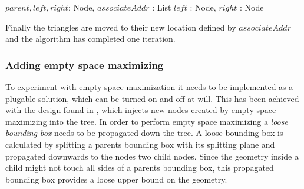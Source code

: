 \begin{algorithm}
  \caption{Compute child node triangle index and range}
  \label{alg:childIndices}
  \begin{algorithmic}
              {$parent, left, right$: Node, $associateAddr$ : List}
              {$left$ : Node, $right$ : Node}{
              }
  \end{algorithmic}
\end{algorithm}

Finally the triangles are moved to their new location defined by
$associateAddr$ and the algorithm has completed one iteration.









\subsubsection{Adding empty space maximizing}\label{sec:gpuEmptySpace}


To experiment with empty space maximization it needs to be implemented
as a plugable solution, which can be turned on and off at will. This
has been achieved with the design found in
, which injects new nodes created by
empty space maximizing into the tree. In order to perform empty space
maximizing a \textit{loose bounding box} needs to be propagated down
the tree. A loose bounding box is calculated by splitting a parents
bounding box with its splitting plane and propagated downwards to the
nodes two child nodes. Since the geometry inside a child might not
touch all sides of a parents bounding box, this propagated bounding
box provides a loose upper bound on the geometry.

